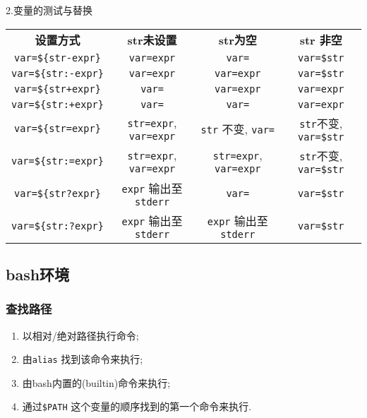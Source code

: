 2.变量的测试与替换
\begin{longtable}{cccc}\hline\hline

\textbf{设置方式}  &  \textbf{str未设置}   &  \textbf{str为空}   &   \textbf{str 非空}   \\

\verb|var=${str-expr}| & \texttt{var=expr} & \texttt{var=} & \texttt{var=\$str}  \\

\verb|var=${str:-expr}| & \texttt{var=expr} & \texttt{var=expr} & \texttt{var=\$str}  \\

\verb|var=${str+expr}| & \texttt{var=} & \texttt{var=expr} & \texttt{var=expr}  \\

\verb|var=${str:+expr}| & \texttt{var=} & \texttt{var=} & \texttt{var=expr}  \\

\verb|var=${str=expr}| & \texttt{str=expr}, \texttt{var=expr} & \texttt{str} 不变, \texttt{var=} & \texttt{str}不变, \texttt{var=\$str}  \\

\verb|var=${str:=expr}| & \texttt{str=expr}, \texttt{var=expr} & \texttt{str=expr}, \texttt{var=expr} & \texttt{str}不变, \texttt{var=\$str}  \\

\verb|var=${str?expr}| & \texttt{expr} 输出至\texttt{stderr} & \texttt{var=} & \texttt{var=\$str}  \\

\verb|var=${str:?expr}| & \texttt{expr} 输出至\texttt{stderr} & \texttt{expr} 输出至\texttt{stderr} & \texttt{var=\$str}  \\\hline
\end{longtable}

\subsection{bash环境}
\subsubsection{查找路径}
\begin{enumerate}
    \item 以相对/绝对路径执行命令;
    \item 由\texttt{alias} 找到该命令来执行;
    \item 由bash内置的(builtin)命令来执行;
    \item 通过\texttt{\$PATH} 这个变量的顺序找到的第一个命令来执行.
\end{enumerate}

